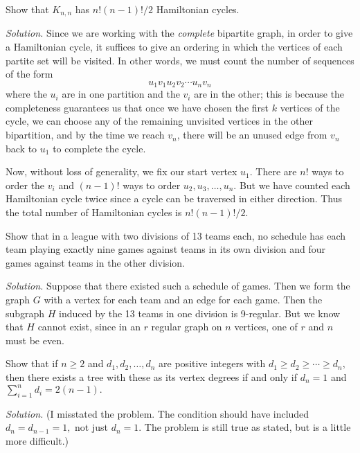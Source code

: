 \documentclass[10pt,reqno]{amsart}
\begin{document}
\begin{outline}[enumerate]
\1 Show that $K_{n,n}$ has $n!(n-1)!/2$ Hamiltonian cycles.

\medskip
\noindent \emph{Solution.}
Since we are working with the \emph{complete} bipartite graph, in order to give
a Hamiltonian cycle, it suffices to give an ordering in which the vertices of
each partite set will be visited. In other words, we must count the number of
sequences of the form \[u_1 v_1 u_2 v_2 \cdots u_n v_n\] where the $u_i$ are in
one partition and the $v_i$ are in the other; this is because the completeness
guarantees us that once we have chosen the first $k$ vertices of the cycle, we
can choose any of the remaining unvisited vertices in the other bipartition,
and by the time we reach $v_n$, there will be an unused edge from $v_n$ back to
$u_1$ to complete the cycle.

Now, without loss of generality, we fix our start vertex $u_1.$ There are $n!$
ways to order the $v_i$ and $(n-1)!$ ways to order $u_2, u_3, \dots, u_n$. But
we have counted each Hamiltonian cycle twice since a cycle can be traversed in
either direction. Thus the total number of Hamiltonian cycles is $n!(n-1)!/2.$

\medskip
\1 Show that in a league with two divisions of 13 teams each, no schedule has
each team playing exactly nine games against teams in its own division and four
games against teams in the other division.

\medskip
\noindent \emph{Solution.} Suppose that there existed such a schedule of games.
Then we form the graph $G$ with a vertex for each team and an edge for each
game. Then the subgraph $H$ induced by the 13 teams in one division is
9-regular. But we know that $H$ cannot exist, since in an $r$ regular graph on
$n$ vertices, one of $r$ and $n$ must be even.

\medskip
\1 Show that if $n \ge 2$ and $d_1, d_2, \dots, d_n$ are positive integers with
$d_1 \ge d_2 \ge \cdots \ge d_n,$ then there exists a tree with these as its
vertex degrees if and only if $d_n = 1$ and $\sum_{i=1}^n d_i = 2(n-1).$

\medskip
\noindent \emph{Solution.} (I misstated the problem. The condition should have
included $d_n = d_{n-1} = 1,$ not just $d_n=1.$ The problem is still true as
stated, but is a little more difficult.)


\end{outline}
\end{document}
